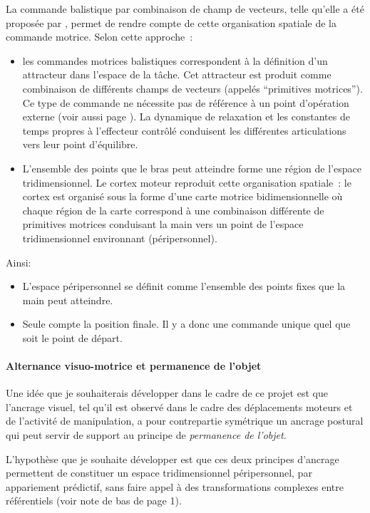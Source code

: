 \documentclass[11pt]{article}
\begin{document}
La commande balistique par combinaison de champ de vecteurs, telle qu'elle a été proposée par , permet de rendre compte de cette organisation spatiale de la commande motrice. Selon cette approche~:
\begin{itemize}
	\item les commandes motrices balistiques correspondent à la définition d'un attracteur dans l'espace de la tâche.  Cet attracteur est produit comme combinaison de différents champs de vecteurs (appelés ``primitives motrices''). Ce type de commande ne nécessite pas de référence à un point d'opération externe (voir aussi page \pageref{sec:feed-plus}). La dynamique de relaxation et les constantes de temps propres à l'effecteur contrôlé conduisent les différentes articulations vers leur point d'équilibre.
	\item L'ensemble des points que le bras peut atteindre forme une région de l'espace tridimensionnel. Le cortex moteur reproduit cette organisation spatiale~: le cortex est organisé sous la forme d'une carte motrice bidimensionnelle où chaque région de la carte correspond à une combinaison différente de primitives motrices conduisant la main vers un point de l'espace tridimensionnel environnant (péripersonnel). 
\end{itemize}
Ainsi:
	\begin{itemize}
		\item L'espace péripersonnel se définit comme l'ensemble des points fixes que la main peut atteindre.
		\item Seule compte la position finale. Il y a donc une commande unique quel que soit le point de départ.
	\end{itemize} 

 
\paragraph{Alternance visuo-motrice et permanence de l'objet}

Une idée que je souhaiterais développer dans le cadre de ce projet est que l'ancrage visuel, tel qu'il est observé dans le cadre des déplacements moteurs et de l'activité de manipulation, a pour contrepartie symétrique un ancrage postural qui peut servir de support au principe de \textit{permanence de l'objet}.

L'hypothèse que je souhaite développer est que ces deux principes d'ancrage permettent de constituer un espace tridimensionnel péripersonnel, par appariement prédictif,
sans faire appel à des transformations complexes entre référentiels
(voir note de bas de page 1).
\end{document}
